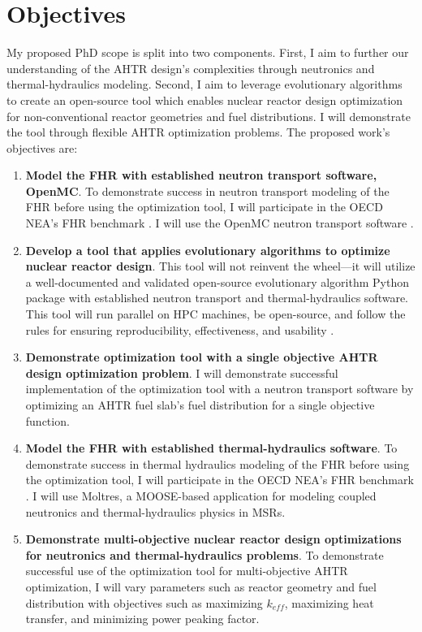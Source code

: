 \section{Objectives}
My proposed PhD scope is split into two components. 
First, I aim to further our understanding of the \gls{AHTR} design's complexities 
through neutronics and thermal-hydraulics modeling. 
Second, I aim to leverage evolutionary algorithms to create an open-source tool 
which enables nuclear reactor design optimization for non-conventional reactor 
geometries and fuel distributions. 
I will demonstrate the tool through flexible \gls{AHTR} optimization problems.  
The proposed work's objectives are: 

\vspace{0.2cm} 
\noindent
\begin{enumerate}[label=\textbf{\Roman*}]
\item \textbf{Model the \gls{FHR} with established neutron transport software, OpenMC}.
To demonstrate success in neutron transport modeling of the \gls{FHR} before 
using the optimization tool, I will participate in the \gls{OECD} \gls{NEA}'s 
\gls{FHR} benchmark \cite{noauthor_fluoride_nodate}. 
I will use the OpenMC neutron transport software \cite{romano_openmc_2013}. 

\item \textbf{Develop a tool that applies evolutionary algorithms to optimize nuclear 
reactor design}. 
This tool will not reinvent the wheel---it will utilize a well-documented 
and validated open-source evolutionary algorithm Python package with established 
neutron transport and thermal-hydraulics software. This tool will run parallel on 
\gls{HPC} machines, be open-source, and follow the rules for ensuring 
reproducibility, effectiveness, and usability 
\cite{list_ten_2017,osborne_ten_2014,sandve_ten_2013}. 

\item \textbf{Demonstrate optimization tool with a single objective AHTR 
design optimization problem}.
I will demonstrate successful implementation of the optimization tool with a
neutron transport software by optimizing an \gls{AHTR} fuel slab's fuel 
distribution for a single objective function. 

\item \textbf{Model the \gls{FHR} with established thermal-hydraulics software}.
To demonstrate success in thermal hydraulics modeling of the \gls{FHR} before 
using the optimization tool, I will participate in the \gls{OECD} \gls{NEA}'s 
\gls{FHR} benchmark \cite{noauthor_fluoride_nodate}. 
I will use Moltres, a MOOSE-based application for modeling coupled neutronics 
and thermal-hydraulics physics in \glspl{MSR}. 

\item \textbf{Demonstrate multi-objective nuclear reactor design optimizations 
for neutronics and thermal-hydraulics problems}.
To demonstrate successful use of the optimization tool for multi-objective 
\gls{AHTR} optimization, 
I will vary parameters such as reactor geometry and fuel distribution with 
objectives such as maximizing $k_{eff}$, maximizing heat transfer, and 
minimizing power peaking factor. 
\end{enumerate}

